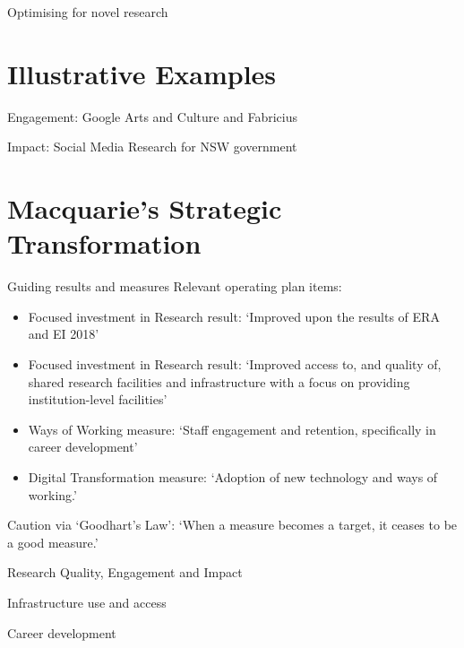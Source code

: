 \documentclass[aspectratio=1610, 11pt]{beamer} %
\begin{document}
\begin{frame}{Optimising for novel research}
\end{frame}

\section{Illustrative Examples}

\begin{frame}{Engagement: Google Arts and Culture and Fabricius}
\end{frame}

\begin{frame}{Impact: Social Media Research for NSW government}
\end{frame}


\section{Macquarie's Strategic Transformation}

\begin{frame}{Guiding results and measures}
Relevant operating plan items: 
\begin{itemize}
    \item Focused investment in Research result: `Improved upon the results of ERA and EI 2018'
    \item Focused investment in Research result: `Improved access to, and quality of, shared research facilities and infrastructure with a focus on providing institution-level facilities'
    \item Ways of Working measure: `Staff engagement and retention, specifically in career development'
    \item Digital Transformation measure: `Adoption of new technology and ways of working.'
\end{itemize}

Caution via `Goodhart's Law': `When a measure becomes a target, it ceases to be a good measure.'

\end{frame}

\begin{frame}{Research Quality, Engagement and Impact}
\end{frame}

\begin{frame}{Infrastructure use and access}
\end{frame}

\begin{frame}{Career development}
\end{frame}
\end{document}
